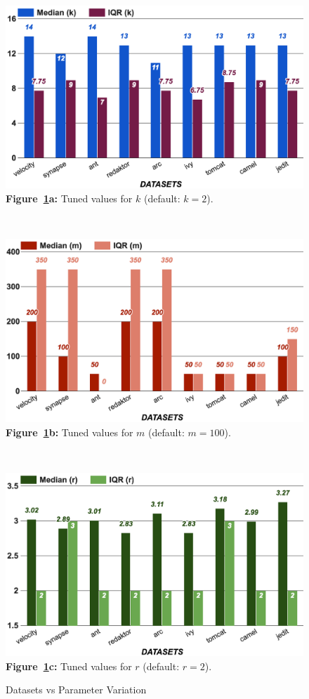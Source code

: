 \documentclass[10pt,conference]{IEEEtran}
\theoremstyle{break}
\theoremstyle{break}
\begin{document}
\begin{figure}[!t]
    \centering
    \begin{minipage}{.3\textwidth}
    \centering
        \includegraphics[width=.95\linewidth]{./fig/k.png}
        {\bf Figure~\ref{fig:para}a:} Tuned values for $k$ (default:  $k=2$).
    \end{minipage}~~%
    \begin{minipage}{.3\textwidth}
    \centering
        \includegraphics[width=.95\linewidth]{./fig/m.png}
        {\bf Figure~\ref{fig:para}b:} Tuned values for $m$ (default: $m=100$).
    \end{minipage}~~%
    \begin{minipage}{.3\textwidth}
    \centering
        \includegraphics[width=.95\linewidth]{./fig/r.png}
        {\bf Figure~\ref{fig:para}c:} Tuned values for $r$ (default:  $r=2$).
    \end{minipage}
    \caption{Datasets vs Parameter Variation}
    \label{fig:para}
\vspace{-0.4cm}
\end{figure}
\end{document}
